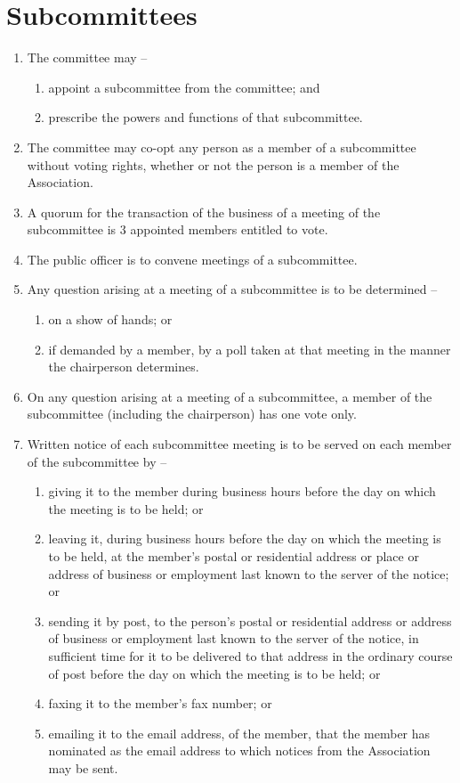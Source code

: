 \documentclass[a4paper,11pt]{article}
\begin{document}
\section{Subcommittees}
\begin{enumerate}
	\item The committee may --
	\begin{enumerate}
		\item appoint a subcommittee from the committee; and
		\item prescribe the powers and functions of that subcommittee.
	\end{enumerate}
	
	\item The committee may co-opt any person as a member of a subcommittee without voting rights, whether or not the person is a member of the Association.
	\item A quorum for the transaction of the business of a meeting of the subcommittee is 3 appointed members entitled to vote.
	\item The public officer is to convene meetings of a subcommittee.
	
	\item Any question arising at a meeting of a subcommittee is to be determined --
	\begin{enumerate}
		\item on a show of hands; or
		\item if demanded by a member, by a poll taken at that meeting in the manner the chairperson determines.
	\end{enumerate}
	
	\item On any question arising at a meeting of a subcommittee, a member of the subcommittee (including the chairperson) has one vote only.
	
	\item Written notice of each subcommittee meeting is to be served on each member of the subcommittee by --
	\begin{enumerate}
		\item giving it to the member during business hours before the day on which the meeting is to be held; or
		\item leaving it, during business hours before the day on which the meeting is to be held, at the member's postal or residential address or place or address of business or employment last known to the server of the notice; or
		\item sending it by post, to the person's postal or residential address or address of business or employment last known to the server of the notice, in sufficient time for it to be delivered to that address in the ordinary course of post before the day on which the meeting is to be held; or
		\item faxing it to the member's fax number; or
		\item emailing it to the email address, of the member, that the member has nominated as the email address to which notices from the Association may be sent.
	\end{enumerate}
\end{enumerate}
\end{document}
